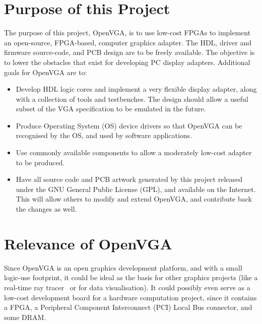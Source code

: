 \section{Purpose of this Project}
The purpose of this project, OpenVGA, is to
use low-cost FPGAs to implement an open-source, FPGA-based, computer graphics
adapter. The HDL, driver and firmware source-code, and PCB design are to be freely available. The
objective is to lower the obstacles that exist for developing PC display
adapters. Additional goals for OpenVGA are to:

\begin{itemize}
  \item Develop HDL logic cores and implement a very flexible display
  adapter, along with a collection of tools and testbenches. The design should
  allow a useful subset of the VGA specification to be emulated in the future.
  \item Produce Operating System (OS) device drivers so that OpenVGA can be recognised by the OS, and
  used by software applications.
  \item Use commonly available components to allow a moderately low-cost adapter
  to be produced.
  \item Have all source code and PCB artwork generated by this project released
  under the GNU General Public License (GPL), and available on the
  Internet. This will allow others to modify and extend OpenVGA, and
  contribute back the changes as well.
\end{itemize}


\section{Relevance of OpenVGA}
Since OpenVGA is an open graphics development platform, and with a small
logic-use footprint, it could be ideal as the basis for other graphics projects
(like a real-time ray tracer~\cite{TTA_Ray_Trace} or for data visualisation). It
could possibly even serve as a low-cost development board for a hardware
computation project, since it contains a FPGA, a Peripheral Component
Interconnect (PCI) Local Bus connector, and some DRAM.

